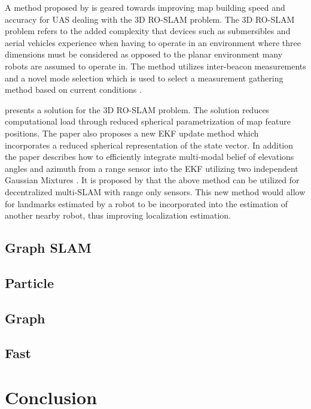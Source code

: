 \documentclass[conference]{IEEEtran}
\begin{document}
A method proposed by \cite{Dios2015} is geared towards improving map building speed and accuracy for UAS dealing with the 3D RO-SLAM problem. The 3D RO-SLAM problem refers to the added complexity that devices such as submersibles \cite{Newman} and aerial vehicles experience when having to operate in an environment where three dimensions must be considered as opposed to the planar environment many robots are assumed to operate in. The method utilizes inter-beacon measurements and a novel mode selection which is used to select a measurement gathering method based on current conditions \cite{Dios2015}.

\cite{Fabresse2013} presents a solution for the 3D RO-SLAM problem. The solution reduces computational load through reduced spherical parametrization of map feature positions. The paper also proposes a new EKF update method which incorporates a reduced spherical representation of the state vector. In addition the paper describes how to efficiently integrate multi-modal belief of elevations angles and azimuth from a range sensor into the EKF utilizing two independent Gaussian Mixtures \cite{Fabresse2013}. It is proposed by \cite{Fabresse2015} that the above method can be utilized for decentralized multi-SLAM with range only sensors. This new method would allow for landmarks estimated by a robot to be incorporated into the estimation of another nearby robot, thus improving localization estimation. 






\subsection{Graph SLAM}
\subsection{Particle}
\subsection{Graph}
\subsection{Fast}

\section{Conclusion}


	
	
	
\end{document}

